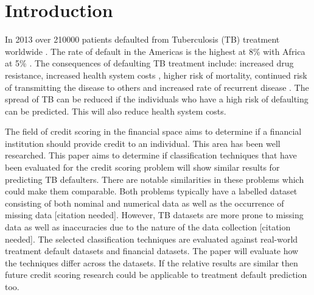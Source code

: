 \documentclass{sig-alternate-05-2015}
\begin{document}
\maketitle
\begin{abstract}
\end{abstract}

%
%
\printccsdesc



\section{Introduction}
In 2013 over 210\hspace*{1mm}000 patients defaulted from Tuberculosis (TB) treatment worldwide \cite{world2015TB}. The rate of default in the Americas is the highest at 8\% with Africa at 5\% \cite{world2015TB}. The consequences of defaulting TB treatment include: increased drug resistance, increased health system costs \cite{Lackey:10356751520150601, muture:6660173120110101}, higher risk of mortality, continued risk of transmitting the disease to others \cite{Lackey:10356751520150601} and increased rate of recurrent disease \cite{Jha:10.1371/journal.pone.0008873}. The spread of TB can be reduced if the individuals who have a high risk of defaulting can be predicted. This will also reduce health system costs.

The field of credit scoring in the financial space aims to determine if a financial institution should provide credit to an individual. This area has been well researched. This paper aims to determine if classification techniques that have been evaluated for the credit scoring problem will show similar results for predicting TB defaulters. There are notable similarities in these problems which could make them comparable. Both problems typically have a labelled dataset consisting of both nominal and numerical data as well as the occurrence of missing data [citation needed]. However, TB datasets are more prone to missing data as well as inaccuracies due to the nature of the data collection [citation needed]. The selected classification techniques are evaluated against real-world treatment default datasets and financial datasets. The paper will evaluate how the techniques differ across the datasets. If the relative results are similar then future credit scoring research could be applicable to treatment default prediction too.
\end{document}
